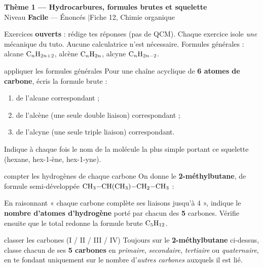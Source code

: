 \documentclass[11pt,a4paper]{article}
\newcommand{\banner}[2]{%
\begin{tcolorbox}[enhanced,colback=primary,colframe=primary,arc=5pt,boxrule=0pt,
   left=5mm,right=5mm,top=2.5mm,bottom=2.5mm,coltext=white]
{\large\bfseries #1}\\[1pt]{\small #2}
\end{tcolorbox}\vspace{2pt}}
\begin{document}
\banner{Thème 1 — Hydrocarbures, formules brutes et squelette}{Niveau \textbf{Facile} — Énoncés \quad$\vert$\quad Fiche 12, Chimie organique}

\begin{consigne}
Exercices \textbf{ouverts} : rédige tes réponses (pas de QCM). Chaque exercice isole \emph{une} mécanique du tuto. Aucune calculatrice n'est nécessaire. Formules générales : alcane $\ce{C_nH_{2n+2}}$, alcène $\ce{C_nH_{2n}}$, alcyne $\ce{C_nH_{2n-2}}$.
\end{consigne}

\begin{exo}{appliquer les formules générales}
Pour une chaîne acyclique de \textbf{6 atomes de carbone}, écris la formule brute :
\begin{enumerate}[label=\textbf{\alph*)},leftmargin=2em,itemsep=1pt]
  \item de l'alcane correspondant ;
  \item de l'alcène (une seule double liaison) correspondant ;
  \item de l'alcyne (une seule triple liaison) correspondant.
\end{enumerate}
Indique à chaque fois le nom de la molécule la plus simple portant ce squelette (hexane, hex-1-ène, hex-1-yne).
\end{exo}

\begin{exo}{compter les hydrogènes de chaque carbone}
On donne le \textbf{2-méthylbutane}, de formule semi-développée $\ce{CH3-CH(CH3)-CH2-CH3}$ :
\begin{center}\end{center}
En raisonnant « chaque carbone complète ses liaisons jusqu'à 4 », indique le \textbf{nombre d'atomes d'hydrogène} porté par chacun des \textbf{5} carbones. Vérifie ensuite que le total redonne la formule brute $\ce{C5H12}$.
\end{exo}

\begin{exo}{classer les carbones (I / II / III / IV)}
Toujours sur le \textbf{2-méthylbutane} ci-dessus, classe chacun de ses \textbf{5 carbones} en \emph{primaire}, \emph{secondaire}, \emph{tertiaire} ou \emph{quaternaire}, en te fondant uniquement sur le nombre d'\emph{autres carbones} auxquels il est lié.
\end{exo}
\end{document}
